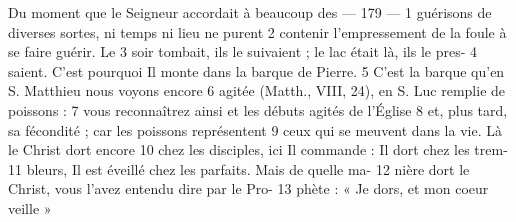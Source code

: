 Du moment que le Seigneur accordait à beaucoup des	 
 	--- 179 ---	 
1	 	guérisons de diverses sortes, ni temps ni lieu ne purent	 
2	 	contenir l'empressement de la foule à se faire guérir. Le	 
3	 	soir tombait, ils le suivaient ; le lac était là, ils le pres-	 
4	 	saient. C'est pourquoi Il monte dans la barque de Pierre.	 
5	 	C'est la barque qu'en S. Matthieu nous voyons encore	 
6	 	agitée (Matth., VIII, 24), en S. Luc remplie de poissons :	 
7	 	vous reconnaîtrez ainsi et les débuts agités de l'Église	 
8	 	et, plus tard, sa fécondité ; car les poissons représentent	 
9	 	ceux qui se meuvent dans la vie. Là le Christ dort encore	 
10	 	chez les disciples, ici Il commande : Il dort chez les trem-	 
11	 	bleurs, Il est éveillé chez les parfaits. Mais de quelle ma-	 
12	 	nière dort le Christ, vous l'avez entendu dire par le Pro-	 
13	 	phète : « Je dors, et mon coeur veille »